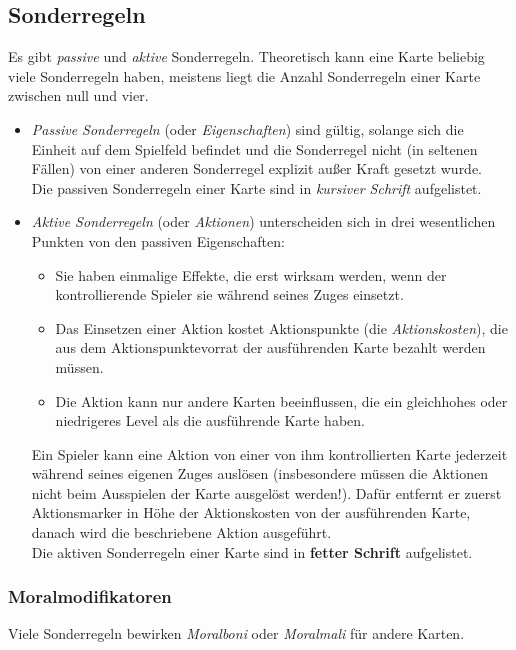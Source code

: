 \documentclass[a4paper,11pt]{report}
\begin{document}
\subsection{Sonderregeln}\label{ssec:Sonderregeln}
Es gibt \emph{passive} und \emph{aktive} Sonderregeln. Theoretisch kann eine Karte beliebig viele Sonderregeln haben, meistens liegt die Anzahl Sonderregeln einer Karte zwischen null und vier.
\begin{itemize}
	\item \emph{Passive Sonderregeln} (oder \emph{Eigenschaften}) sind gültig, solange sich die Einheit auf dem Spielfeld befindet und die Sonderregel nicht (in seltenen Fällen) von einer anderen Sonderregel explizit außer Kraft gesetzt wurde.\\
	Die passiven Sonderregeln einer Karte sind in \textit{kursiver Schrift} aufgelistet.
	\item \emph{Aktive Sonderregeln} (oder \emph{Aktionen}) unterscheiden sich in drei wesentlichen Punkten von den passiven Eigenschaften:
	\begin{itemize}
		\item Sie haben einmalige Effekte, die erst wirksam werden, wenn der kontrollierende Spieler sie während seines Zuges einsetzt.
		\item Das Einsetzen einer Aktion kostet Aktionspunkte (die \emph{Aktionskosten}), die aus dem Aktionspunktevorrat der ausführenden Karte bezahlt werden müssen.
		\item Die Aktion kann nur andere Karten beeinflussen, die ein gleichhohes oder niedrigeres Level als die ausführende Karte haben.
	\end{itemize}
	Ein Spieler kann eine Aktion von einer von ihm kontrollierten Karte jederzeit während seines eigenen Zuges auslösen (insbesondere müssen die Aktionen nicht beim Ausspielen der Karte ausgelöst werden!). Dafür entfernt er zuerst Aktionsmarker in Höhe der Aktionskosten von der ausführenden Karte, danach wird die beschriebene Aktion ausgeführt.\\
	Die aktiven Sonderregeln einer Karte sind in \textbf{fetter Schrift} aufgelistet.
\end{itemize}

\subsubsection{Moralmodifikatoren}
Viele Sonderregeln bewirken \emph{Moralboni} oder \emph{Moralmali} für andere Karten.
\end{document}
